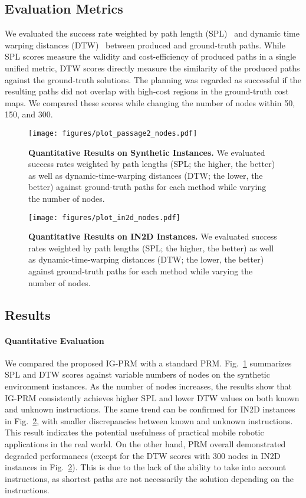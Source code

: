 \subsection{Evaluation Metrics}
We evaluated the success rate weighted by path length (SPL)~\cite{anderson2018evaluation} and dynamic time warping distances (DTW)~\cite{muller2007dynamic} between produced and ground-truth paths. While SPL scores measure the validity and cost-efficiency of produced paths in a single unified metric, DTW scores directly measure the similarity of the produced paths against the ground-truth solutions. The planning was regarded as successful if the resulting paths did not overlap with high-cost regions in the ground-truth cost maps. We compared these scores while changing the number of nodes within 50, 150, and 300. 

\begin{figure}[t]
    \centering
    \texttt{[image: figures/plot\_passage2\_nodes.pdf]}
    \caption{\textbf{Quantitative Results on Synthetic Instances.} We evaluated success rates weighted by path lengths (SPL; the higher, the better) as well as dynamic-time-warping distances (DTW; the lower, the better) against ground-truth paths for each method while varying the number of nodes.}
    \label{fig:plot_passage2_nodes} 
\end{figure}

\begin{figure}[t]
    \centering
    \texttt{[image: figures/plot\_in2d\_nodes.pdf]}
    \caption{\textbf{Quantitative Results on IN2D Instances.} We evaluated success rates weighted by path lengths (SPL; the higher, the better) as well as dynamic-time-warping distances (DTW; the lower, the better) against ground-truth paths for each method while varying the number of nodes.}
    \label{fig:plot_in2d_nodes}
\end{figure}

\subsection{Results}
\paragraph{Quantitative Evaluation}
We compared the proposed IG-PRM with a standard PRM. Fig.~\ref{fig:plot_passage2_nodes} summarizes SPL and DTW scores against variable numbers of nodes on the synthetic environment instances. As the number of nodes increases, the results show that IG-PRM consistently achieves higher SPL and lower DTW values on both known and unknown instructions. The same trend can be confirmed for IN2D instances in Fig.~\ref{fig:plot_in2d_nodes}, with smaller discrepancies between known and unknown instructions. This result indicates the potential usefulness of practical mobile robotic applications in the real world. On the other hand, PRM overall demonstrated degraded performances (except for the DTW scores with 300 nodes in IN2D instances in Fig.~\ref{fig:plot_in2d_nodes}). This is due to the lack of the ability to take into account instructions, as shortest paths are not necessarily the solution depending on the instructions.

